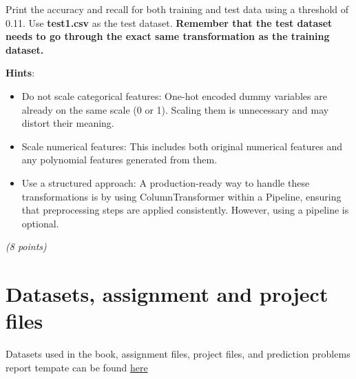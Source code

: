 \documentclass[
  letterpaper,
  DIV=11,
  numbers=noendperiod]{scrreprt}
\providecommand{\tightlist}{%
  \setlength{\itemsep}{0pt}\setlength{\parskip}{0pt}}\usepackage{longtable,booktabs,array}
\begin{document}
Print the accuracy and recall for both training and test data using a
threshold of 0.11. Use \textbf{test1.csv} as the test dataset.
\textbf{Remember that the test dataset needs to go through the exact
same transformation as the training dataset.}

\textbf{Hints}:

\begin{itemize}
\tightlist
\item
  Do not scale categorical features: One-hot encoded dummy variables are
  already on the same scale (0 or 1). Scaling them is unnecessary and
  may distort their meaning.
\item
  Scale numerical features: This includes both original numerical
  features and any polynomial features generated from them.
\item
  Use a structured approach: A production-ready way to handle these
  transformations is by using ColumnTransformer within a Pipeline,
  ensuring that preprocessing steps are applied consistently. However,
  using a pipeline is optional.
\end{itemize}

\emph{(8 points)}

\chapter{Datasets, assignment and project
files}\label{datasets-assignment-and-project-files}

Datasets used in the book, assignment files, project files, and
prediction problems report tempate can be found
\href{https://nuwildcat-my.sharepoint.com/:f:/g/personal/lsi8012_ads_northwestern_edu/EoCM59cBQ4NIqFpdDS_LwXgBRZul47opYaNpWvd9dGD6Ag?e=nqJSzq}{here}
\end{document}
